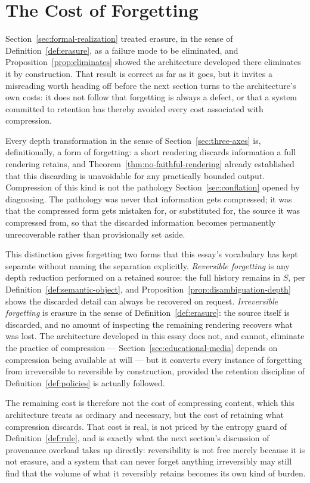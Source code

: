 \documentclass[11pt]{article}
\theoremstyle{definition}
\begin{document}
\section{The Cost of Forgetting}
\label{sec:cost-forgetting}

Section~\ref{sec:formal-realization} treated erasure, in the sense of Definition~\ref{def:erasure}, as a failure mode to be eliminated, and Proposition~\ref{prop:eliminates} showed the architecture developed there eliminates it by construction. That result is correct as far as it goes, but it invites a misreading worth heading off before the next section turns to the architecture's own costs: it does not follow that forgetting is always a defect, or that a system committed to retention has thereby avoided every cost associated with compression.

Every depth transformation in the sense of Section~\ref{sec:three-axes} is, definitionally, a form of forgetting: a short rendering discards information a full rendering retains, and Theorem~\ref{thm:no-faithful-rendering} already established that this discarding is unavoidable for any practically bounded output. Compression of this kind is not the pathology Section~\ref{sec:conflation} opened by diagnosing. The pathology was never that information gets compressed; it was that the compressed form gets mistaken for, or substituted for, the source it was compressed from, so that the discarded information becomes permanently unrecoverable rather than provisionally set aside.

This distinction gives forgetting two forms that this essay's vocabulary has kept separate without naming the separation explicitly. \emph{Reversible forgetting} is any depth reduction performed on a retained source: the full history remains in $S$, per Definition~\ref{def:semantic-object}, and Proposition~\ref{prop:disambiguation-depth} shows the discarded detail can always be recovered on request. \emph{Irreversible forgetting} is erasure in the sense of Definition~\ref{def:erasure}: the source itself is discarded, and no amount of inspecting the remaining rendering recovers what was lost. The architecture developed in this essay does not, and cannot, eliminate the practice of compression --- Section~\ref{sec:educational-media} depends on compression being available at will --- but it converts every instance of forgetting from irreversible to reversible by construction, provided the retention discipline of Definition~\ref{def:policies} is actually followed.

The remaining cost is therefore not the cost of compressing content, which this architecture treats as ordinary and necessary, but the cost of retaining what compression discards. That cost is real, is not priced by the entropy guard of Definition~\ref{def:rule}, and is exactly what the next section's discussion of provenance overload takes up directly: reversibility is not free merely because it is not erasure, and a system that can never forget anything irreversibly may still find that the volume of what it reversibly retains becomes its own kind of burden.
\end{document}
